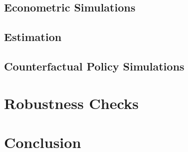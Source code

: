 \documentclass[letterpaper,12pt]{article}
\begin{document}

\subsection{Econometric Simulations}




\subsection{Estimation}




\subsection{Counterfactual Policy Simulations}





\section{Robustness Checks}\label{sec: Robust}





\section{Conclusion}\label{sec: Conclusion}






\end{document}

